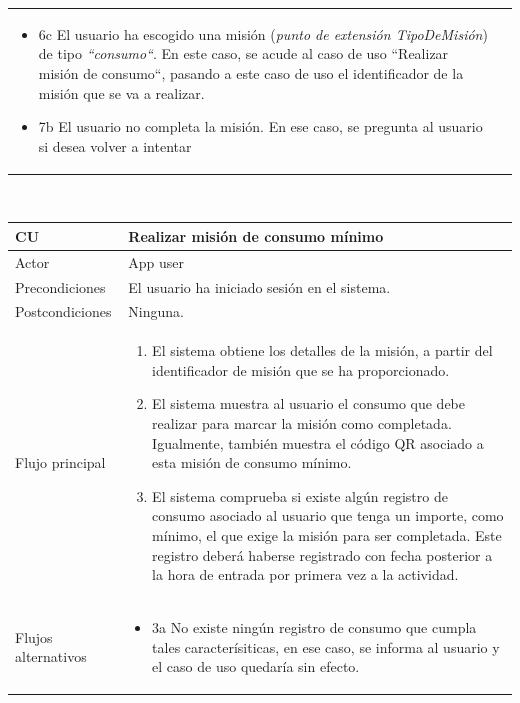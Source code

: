 \documentclass[twoside]{report}
\newcommand\addrow[2]{#1 &#2\\ }
\newcommand\addheading[2]{#1 &#2\\ \hline}
\newcommand\tabularhead{\begin{tabular}{lp{0.7\textwidth}}
\hline
}
\newenvironment{usecase}{\tabularhead}
{\hline\end{tabular}}
\begin{document}
\begin{usecase}
{\begin{itemize}
        \item 6c El usuario ha escogido una misión (\textit{punto de extensión TipoDeMisión}) de tipo \textit{“consumo“}. En este caso, se acude al caso de uso “Realizar misión de consumo“, pasando a este caso de uso el identificador de la misión que se va a realizar.
        
        \item 7b El usuario no completa la misión. En ese caso, se pregunta al usuario si desea volver a intentar
  		\end{itemize}
  }
\end{usecase}\\

\vspace{0.5cm}

\begin{usecase}
  \addheading{\textbf{CU\arabic{usecase}}}{Realizar misión de consumo mínimo} 
  \addrow{Actor}{App user}
  \addrow{Precondiciones}{El usuario ha iniciado sesión en el sistema.}
  \addrow{Postcondiciones}{Ninguna.}
  \addrow{Flujo principal}{
  		\begin{enumerate}
  		\item El sistema obtiene los detalles de la misión, a partir del identificador de misión que se ha proporcionado.
  		\item El sistema muestra al usuario el consumo que debe realizar para marcar la misión como completada. Igualmente, también muestra el código QR asociado a esta misión de consumo mínimo.
  		\item El sistema comprueba si existe algún registro de consumo asociado al usuario que tenga un importe, como mínimo, el que exige la misión para ser completada. Este registro deberá haberse registrado con fecha posterior a la hora de entrada por primera vez a la actividad.
  		\end{enumerate}
  }
  \addrow{Flujos alternativos}{
  		\begin{itemize}
  		\item 3a No existe ningún registro de consumo que cumpla tales caracterísiticas, en ese caso, se informa al usuario y el caso de uso quedaría sin efecto.
  		\end{itemize}
  }
\end{usecase}\\

\vspace{0.5cm}
\end{document}
